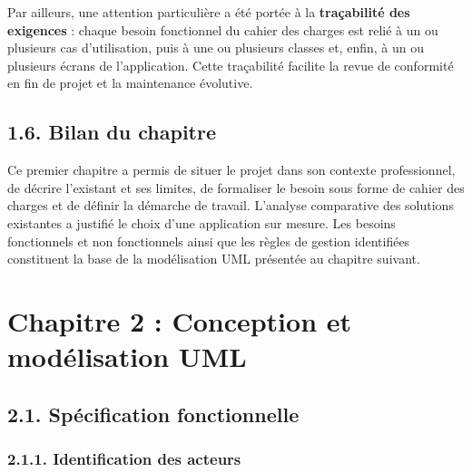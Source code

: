 \documentclass[11pt,a4paper]{report}
\begin{document}
Par ailleurs, une attention particulière a été portée à la \textbf{traçabilité des exigences} : chaque besoin fonctionnel du cahier des charges est relié à un ou plusieurs cas d'utilisation, puis à une ou plusieurs classes et, enfin, à un ou plusieurs écrans de l'application. Cette traçabilité facilite la revue de conformité en fin de projet et la maintenance évolutive.
\section*{1.6. Bilan du chapitre}

Ce premier chapitre a permis de situer le projet dans son contexte professionnel, de décrire l'existant et ses limites, de formaliser le besoin sous forme de cahier des charges et de définir la démarche de travail. L'analyse comparative des solutions existantes a justifié le choix d'une application sur mesure. Les besoins fonctionnels et non fonctionnels ainsi que les règles de gestion identifiées constituent la base de la modélisation UML présentée au chapitre suivant.
\chapter*{Chapitre 2 : Conception et modélisation UML}
\section*{2.1. Spécification fonctionnelle}
\subsection*{2.1.1. Identification des acteurs}
\end{document}
